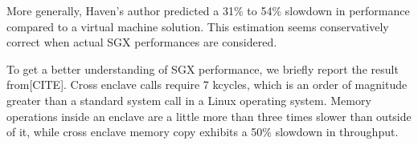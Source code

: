 More generally, Haven's author predicted a 31\% to 54\% slowdown in performance compared to a virtual machine solution.
This estimation seems conservatively correct when actual SGX performances are considered.

To get a better understanding of SGX performance, we briefly report the result from[CITE].
Cross enclave calls require 7 kcycles, which is an order of magnitude greater than a standard system call in a Linux operating system.
Memory operations inside an enclave are a little more than three times slower than outside of it, while cross enclave memory copy exhibits a 50\% slowdown in throughput.